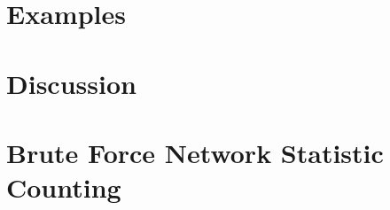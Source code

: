 \documentclass[oneside]{myumnStatThesis}
\begin{document}
\chapter{Examples} \label{S:Examples}


\chapter{Discussion}



%

%

\appendix
\chapter{Brute Force Network Statistic Counting} \label{Section:Count Triangles}


\end{document}
